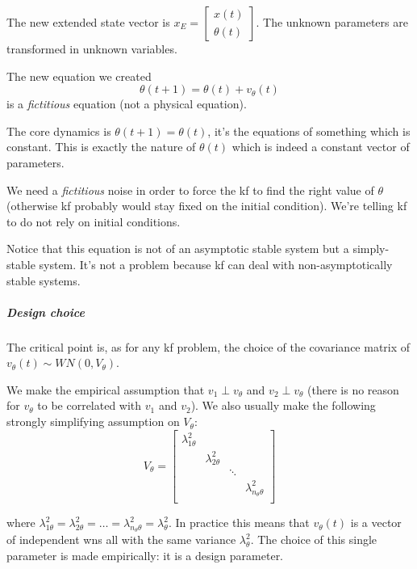 The new extended state vector is $x_E = \begin{bmatrix} x(t) \\ \theta(t) \end{bmatrix}$.
The unknown parameters are transformed in unknown variables.

\begin{remark}
    The new equation we created
    \[
        \theta(t+1) = \theta(t) + v_\theta(t)
    \]
    is a \emph{fictitious} equation (not a physical equation).

    The core dynamics is $\theta(t+1)=\theta(t)$, it's the equations of something which is constant.
    This is exactly the nature of $\theta(t)$ which is indeed a constant vector of parameters.

    We need a \emph{fictitious} noise in order to force the \acrlong{kf} to find the right value of $\theta$ (otherwise \gls{kf} probably would stay fixed on the initial condition).
    We're telling \gls{kf} to do not rely on initial conditions.

    Notice that this equation is not of an asymptotic stable system but a simply-stable system.
    It's not a problem because \gls{kf} can deal with non-asymptotically stable systems.
\end{remark}

\subparagraph{Design choice} The critical point is, as for any \gls{kf} problem, the choice of the covariance matrix of $v_\theta(t) \sim WN(0, V_\theta)$. 

We make the empirical assumption that $v_1 \perp v_\theta$ and $v_2 \perp v_\theta$ (there is no reason for $v_\theta$ to be correlated with $v_1$ and $v_2$).
We also usually make the following strongly simplifying assumption on $V_\theta$: 
\[
    V_\theta = \begin{bmatrix}
        \lambda_{1\theta}^2 & & & \\
        & \lambda_{2\theta}^2 & & \\
        & & \ddots & \\
        & & & \lambda_{n_\theta\theta}^2\\
    \end{bmatrix}
\]

where $\lambda_{1\theta}^2=\lambda_{2\theta}^2=\dots=\lambda_{n_\theta\theta}^2 = \lambda_{\theta}^2$.
In practice this means that $v_\theta(t)$ is a vector of independent \gls{wn}s all with the same variance $\lambda_\theta^2$.
The choice of this single parameter is made empirically: it is a design parameter. 

